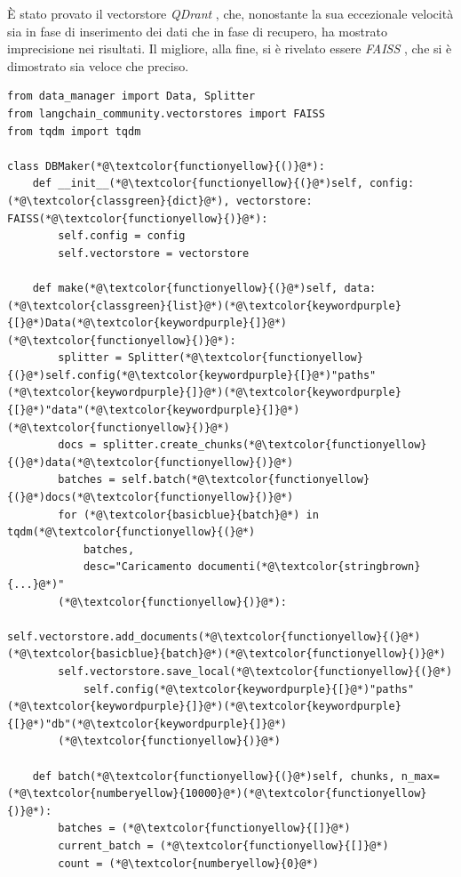 È stato provato il vectorstore \textit{QDrant} \cite{qdrant}, che, nonostante la sua eccezionale velocità sia in fase di inserimento dei dati che in fase di recupero, ha mostrato imprecisione nei risultati. Il migliore, alla fine, si è rivelato essere \textit{FAISS} \cite{faiss,douze2024faisslibrary}, che si è dimostrato sia veloce che preciso.
\begin{lstlisting}[label=lst:dbmaker, caption={Implementazione del DB Maker}]
from data_manager import Data, Splitter
from langchain_community.vectorstores import FAISS
from tqdm import tqdm

class DBMaker(*@\textcolor{functionyellow}{()}@*):
    def __init__(*@\textcolor{functionyellow}{(}@*)self, config: (*@\textcolor{classgreen}{dict}@*), vectorstore: FAISS(*@\textcolor{functionyellow}{)}@*):
        self.config = config
        self.vectorstore = vectorstore
    
    def make(*@\textcolor{functionyellow}{(}@*)self, data: (*@\textcolor{classgreen}{list}@*)(*@\textcolor{keywordpurple}{[}@*)Data(*@\textcolor{keywordpurple}{]}@*)(*@\textcolor{functionyellow}{)}@*):
        splitter = Splitter(*@\textcolor{functionyellow}{(}@*)self.config(*@\textcolor{keywordpurple}{[}@*)"paths"(*@\textcolor{keywordpurple}{]}@*)(*@\textcolor{keywordpurple}{[}@*)"data"(*@\textcolor{keywordpurple}{]}@*)(*@\textcolor{functionyellow}{)}@*)
        docs = splitter.create_chunks(*@\textcolor{functionyellow}{(}@*)data(*@\textcolor{functionyellow}{)}@*)
        batches = self.batch(*@\textcolor{functionyellow}{(}@*)docs(*@\textcolor{functionyellow}{)}@*)
        for (*@\textcolor{basicblue}{batch}@*) in tqdm(*@\textcolor{functionyellow}{(}@*)
            batches,
            desc="Caricamento documenti(*@\textcolor{stringbrown}{...}@*)"
        (*@\textcolor{functionyellow}{)}@*):
            self.vectorstore.add_documents(*@\textcolor{functionyellow}{(}@*)(*@\textcolor{basicblue}{batch}@*)(*@\textcolor{functionyellow}{)}@*)
        self.vectorstore.save_local(*@\textcolor{functionyellow}{(}@*)
            self.config(*@\textcolor{keywordpurple}{[}@*)"paths"(*@\textcolor{keywordpurple}{]}@*)(*@\textcolor{keywordpurple}{[}@*)"db"(*@\textcolor{keywordpurple}{]}@*)
        (*@\textcolor{functionyellow}{)}@*)
    
    def batch(*@\textcolor{functionyellow}{(}@*)self, chunks, n_max=(*@\textcolor{numberyellow}{10000}@*)(*@\textcolor{functionyellow}{)}@*):
        batches = (*@\textcolor{functionyellow}{[]}@*)
        current_batch = (*@\textcolor{functionyellow}{[]}@*)
        count = (*@\textcolor{numberyellow}{0}@*)


\end{lstlisting}
